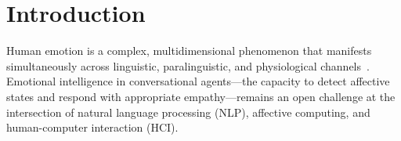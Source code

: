 \documentclass[sigconf, review=true]{acmart}
\begin{document}
%
%
%


\maketitle

\section{Introduction}
\label{sec:intro}

Human emotion is a complex, multidimensional phenomenon that
manifests simultaneously across linguistic, paralinguistic, and
physiological channels~\cite{ekman1992}.
Emotional intelligence in conversational agents---the capacity to
detect affective states and respond with appropriate
empathy---remains an open challenge at the intersection of natural
language processing (NLP), affective computing, and
human-computer interaction (HCI).
\end{document}
